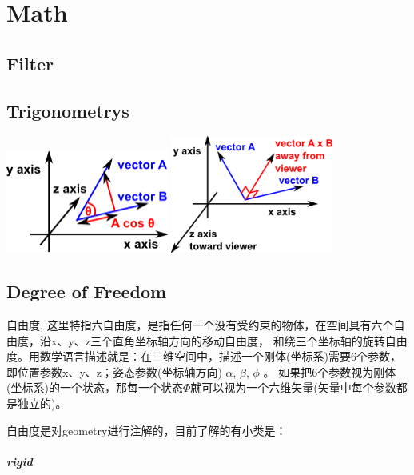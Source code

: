 \chapter{Math}

\section{Filter}



\section{Trigonometrys}

\begin{center}
    \includegraphics[width=0.4\textwidth]{images/dotProduct.png}
    \includegraphics[width=0.4\textwidth]{images/crossProduct.png}
\end{center}

\section{Degree of Freedom}

自由度, 这里特指六自由度，是指任何一个没有受约束的物体，在空间具有六个自由度，沿x、y、z三个直角坐标轴方向的移动自由度，
和绕三个坐标轴的旋转自由度。用数学语言描述就是：在三维空间中，描述一个刚体(坐标系)需要6个参数，即位置参数x、y、z；姿态参数(坐标轴方向)
$\alpha$, $\beta$, $\phi$ 。 如果把6个参数视为刚体(坐标系)的一个状态，那每一个状态$\Phi$就可以视为一个六维矢量(矢量中每个参数都是独立的)。

自由度是对geometry进行注解的，目前了解的有小类是：

\paragraph{rigid}

